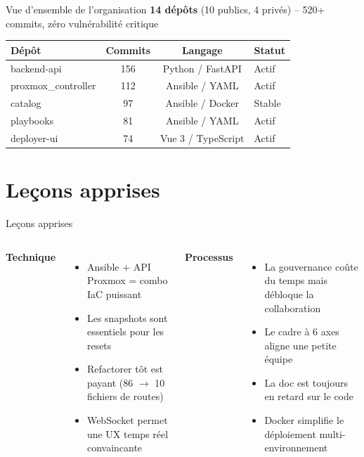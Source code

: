 \documentclass[aspectratio=169]{beamer}
\begin{document}
\begin{frame}{Vue d'ensemble de l'organisation \; \faClipboardCheck}
  \textbf{14 d\'ep\^ots} (10 publics, 4 priv\'es) -- \alert{520+ commits}, z\'ero vuln\'erabilit\'e critique\\[3mm]

  \begin{table}
    \footnotesize\color{cyber-ink}
    \begin{tabular}{l|ccl}
      \textbf{D\'ep\^ot} & \textbf{Commits} & \textbf{Langage} & \textbf{Statut} \\
      \hline
      backend-api & 156 & Python / FastAPI & Actif \\
      proxmox\_controller & 112 & Ansible / YAML & Actif \\
      catalog & 97 & Ansible / Docker & Stable \\
      playbooks & 81 & Ansible / YAML & Actif \\
      deployer-ui & 74 & Vue 3 / TypeScript & Actif \\
    \end{tabular}
  \end{table}
\end{frame}

\section{Le\c{c}ons apprises}

\begin{frame}{Le\c{c}ons apprises \; \faLightbulb}
  \begin{columns}[T]
    \textbf{Technique}
    \begin{itemize}
      \item \alert{Ansible + API Proxmox} = combo IaC puissant
      \item Les snapshots sont essentiels pour les resets
      \item \alert{Refactorer t\^ot est payant} (86 $\rightarrow$ 10 fichiers de routes)
      \item WebSocket permet une UX temps r\'eel convaincante
    \end{itemize}

    \textbf{Processus}
    \begin{itemize}
      \item \alert{La gouvernance co\^ute du temps} mais d\'ebloque la collaboration
      \item Le cadre \`a 6 axes aligne une petite \'equipe
      \item La doc est toujours en retard sur le code
      \item Docker simplifie le d\'eploiement multi-environnement
    \end{itemize}
  \end{columns}
\end{frame}
\end{document}
